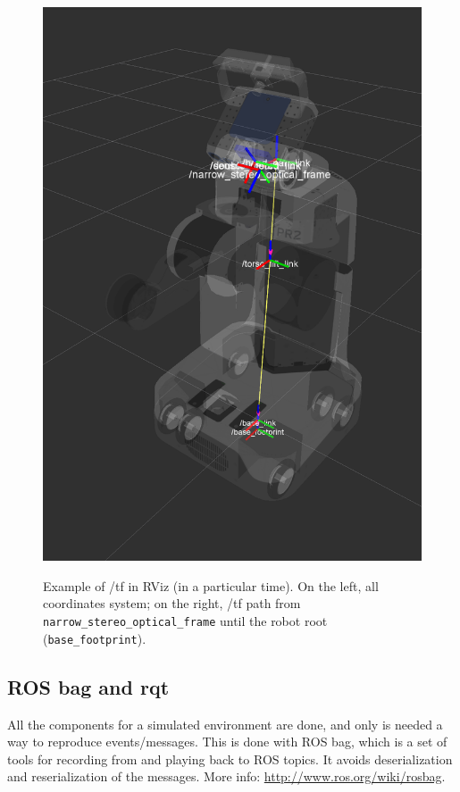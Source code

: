 \begin{figure}[!htbp]
{    \centering\includegraphics[height=0.3\textheight]{images/screenshots/tf02.png}
    \label{fig:tf02}
  }
  \caption{Example of /tf in RViz (in a particular time). On the left, all coordinates system; on the right, /tf path from \texttt{narrow\_stereo\_optical\_frame} until the robot root (\texttt{base\_footprint}).}
   \label{fig:tf}
\end{figure}


\subsection{ROS bag and rqt}
\label{sec:rosbag}

All the components for a simulated environment are done, and only is needed a way to reproduce events/messages. This is done with ROS bag, which is a set of tools for recording from and playing back to ROS topics. It avoids deserialization and reserialization of the messages. More info: \url{http://www.ros.org/wiki/rosbag}.

